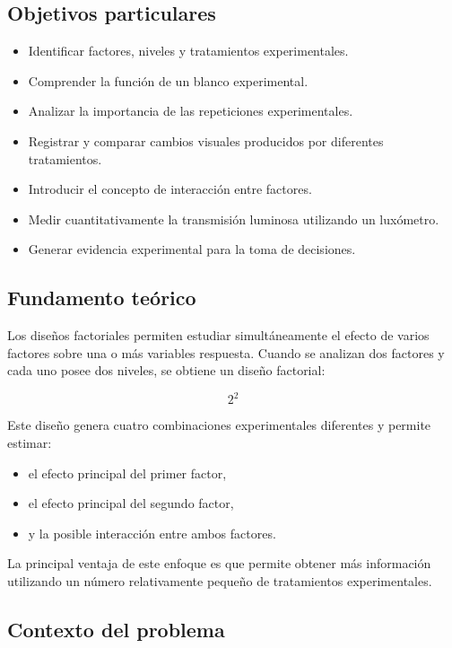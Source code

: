\subsection{Objetivos particulares}

\begin{itemize}
\item Identificar factores, niveles y tratamientos experimentales.
\item Comprender la función de un blanco experimental.
\item Analizar la importancia de las repeticiones experimentales.
\item Registrar y comparar cambios visuales producidos por diferentes tratamientos.
\item Introducir el concepto de interacción entre factores.
\item Medir cuantitativamente la transmisión luminosa utilizando un luxómetro.
\item Generar evidencia experimental para la toma de decisiones.
\end{itemize}

\subsection{Fundamento teórico}

Los diseños factoriales permiten estudiar simultáneamente el efecto de varios factores sobre una o más variables respuesta. Cuando se analizan dos factores y cada uno posee dos niveles, se obtiene un diseño factorial:

\[
2^2
\]

Este diseño genera cuatro combinaciones experimentales diferentes y permite estimar:

\begin{itemize}
\item el efecto principal del primer factor,
\item el efecto principal del segundo factor,
\item y la posible interacción entre ambos factores.
\end{itemize}

La principal ventaja de este enfoque es que permite obtener más información utilizando un número relativamente pequeño de tratamientos experimentales.

\subsection{Contexto del problema}

